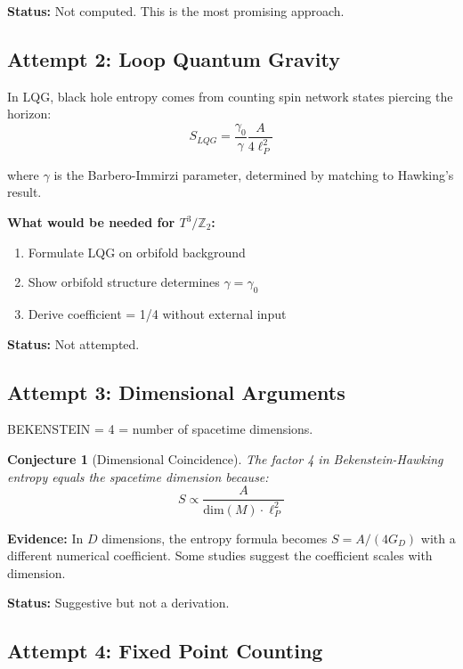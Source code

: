 \documentclass[12pt,a4paper]{article}
\newtheorem{conjecture}{Conjecture}
\begin{document}
\textbf{Status:} Not computed. This is the most promising approach.

\subsection{Attempt 2: Loop Quantum Gravity}

In LQG, black hole entropy comes from counting spin network states piercing the horizon:
\begin{equation}
S_{LQG} = \frac{\gamma_0}{\gamma} \frac{A}{4\ell_P^2}
\end{equation}

where $\gamma$ is the Barbero-Immirzi parameter, determined by matching to Hawking's result.

\textbf{What would be needed for $T^3/\mathbb{Z}_2$:}
\begin{enumerate}
    \item Formulate LQG on orbifold background
    \item Show orbifold structure determines $\gamma = \gamma_0$
    \item Derive coefficient = 1/4 without external input
\end{enumerate}

\textbf{Status:} Not attempted.

\subsection{Attempt 3: Dimensional Arguments}

BEKENSTEIN = 4 = number of spacetime dimensions.

\begin{conjecture}[Dimensional Coincidence]
The factor 4 in Bekenstein-Hawking entropy equals the spacetime dimension because:
\begin{equation}
S \propto \frac{A}{\text{dim}(M) \cdot \ell_P^2}
\end{equation}
\end{conjecture}

\textbf{Evidence:} In $D$ dimensions, the entropy formula becomes $S = A/(4G_D)$ with a different numerical coefficient. Some studies suggest the coefficient scales with dimension.

\textbf{Status:} Suggestive but not a derivation.

\subsection{Attempt 4: Fixed Point Counting}
\end{document}
